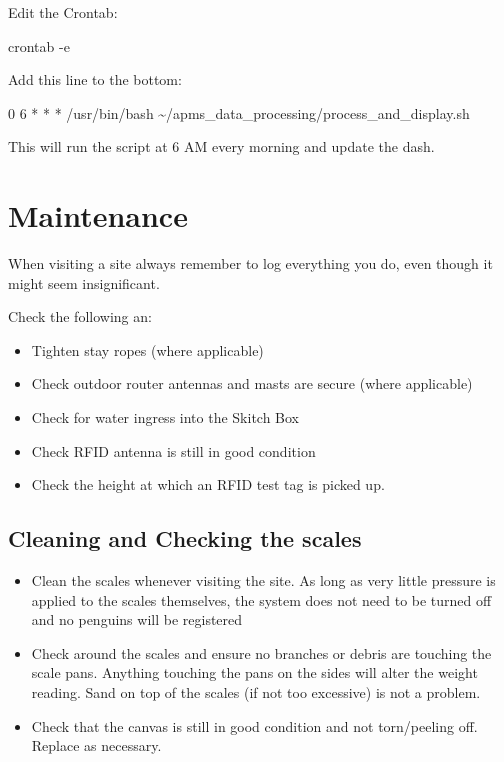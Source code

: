 \documentclass[
  letterpaper,
]{scrbook}
\newenvironment{Shaded}{\begin{snugshade}}{\end{snugshade}}
\newcommand{\AttributeTok}[1]{\textcolor[rgb]{0.40,0.45,0.13}{#1}}
\newcommand{\ExtensionTok}[1]{\textcolor[rgb]{0.00,0.23,0.31}{#1}}
\newcommand{\FunctionTok}[1]{\textcolor[rgb]{0.28,0.35,0.67}{#1}}
\newcommand{\NormalTok}[1]{\textcolor[rgb]{0.00,0.23,0.31}{#1}}
\newcommand{\PreprocessorTok}[1]{\textcolor[rgb]{0.68,0.00,0.00}{#1}}
\begin{document}
Edit the Crontab:

\begin{Shaded}
\begin{Highlighting}[]
\FunctionTok{crontab} \AttributeTok{{-}e}
\end{Highlighting}
\end{Shaded}

Add this line to the bottom:

\begin{Shaded}
\begin{Highlighting}[]
\ExtensionTok{0}\NormalTok{ 6 }\PreprocessorTok{*} \PreprocessorTok{*} \PreprocessorTok{*}\NormalTok{ /usr/bin/bash \textasciitilde{}/apms\_data\_processing/process\_and\_display.sh}
\end{Highlighting}
\end{Shaded}

This will run the script at 6 AM every morning and update the dash.

\chapter{Maintenance}\label{maintenance}

When visiting a site always remember to log everything you do, even
though it might seem insignificant.

Check the following an:

\begin{itemize}
\item
  Tighten stay ropes (where applicable)
\item
  Check outdoor router antennas and masts are secure (where applicable)
\item
  Check for water ingress into the Skitch Box
\item
  Check RFID antenna is still in good condition
\item
  Check the height at which an RFID test tag is picked up.
\end{itemize}

\section{Cleaning and Checking the
scales}\label{cleaning-and-checking-the-scales}

\begin{itemize}
\item
  Clean the scales whenever visiting the site. As long as very little
  pressure is applied to the scales themselves, the system does not need
  to be turned off and no penguins will be registered
\item
  Check around the scales and ensure no branches or debris are touching
  the scale pans. Anything touching the pans on the sides will alter the
  weight reading. Sand on top of the scales (if not too excessive) is
  not a problem.
\item
  Check that the canvas is still in good condition and not torn/peeling
  off. Replace as necessary.
\end{itemize}
\end{document}

